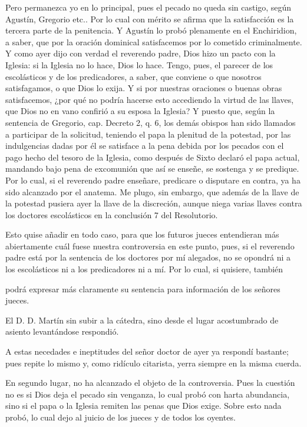 Pero permanezca yo en lo principal, pues el pecado no queda sin castigo, según Agustín, Gregorio etc.. Por lo cual con mérito se afirma que la satisfacción es la tercera parte de la penitencia. Y Agustín lo probó plenamente en el Enchiridion, a saber, que por la oración dominical satisfacemos por lo cometido criminalmente. Y como ayer dijo con verdad el reverendo padre, Dios hizo un pacto con la Iglesia: si la Iglesia no lo hace, Dios lo hace. Tengo, pues, el parecer de los escolásticos y de los predicadores, a saber, que conviene o que nosotros satisfagamos, o que Dios lo exija. Y si por nuestras oraciones o buenas obras satisfacemos, ¿por qué no podría hacerse esto accediendo la virtud de las llaves, que Dios no en vano confirió a su esposa la Iglesia? Y puesto que, según la sentencia de Gregorio, cap. Decreto 2, q. 6, los demás obispos han sido llamados a participar de la solicitud, teniendo el papa la plenitud de la potestad, por las indulgencias dadas por él se satisface a la pena debida por los pecados con el pago hecho del tesoro de la Iglesia, como después de Sixto declaró el papa actual, mandando bajo pena de excomunión que así se enseñe, \marginpar{\small[382]} se sostenga y se predique. Por lo cual, si el reverendo padre enseñare, predicare o disputare en contra, ya ha sido alcanzado por el anatema. Me plugo, sin embargo, que además de la llave de la potestad pusiera ayer la llave de la discreción, aunque niega varias llaves contra los doctores escolásticos en la conclusión 7 del Resolutorio.

Esto quise añadir en todo caso, para que los futuros jueces entendieran más abiertamente cuál fuese nuestra controversia en este punto, pues, si el reverendo padre está por la sentencia de los doctores por mí alegados, no se opondrá ni a los escolásticos ni a los predicadores ni a mí. Por lo cual, si quisiere, también

podrá expresar más claramente su sentencia para información de los señores jueces.

El D. D. Martín
sin subir a la cátedra, sino desde el lugar acostumbrado de asiento
levantándose respondió.

A estas necedades e ineptitudes del señor doctor de ayer ya respondí bastante; pues repite lo mismo y, como ridículo citarista, yerra siempre en la misma cuerda.

En segundo lugar, no ha alcanzado el objeto de la controversia. Pues la cuestión no es si Dios deja el pecado sin venganza, lo cual probó con harta abundancia, sino si el papa o la Iglesia remiten las penas que Dios exige. Sobre esto nada probó, lo cual dejo al juicio de los jueces y de todos los oyentes.

